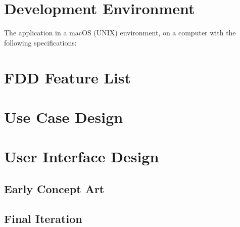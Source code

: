 \section{Development Environment}
The application in a macOS (UNIX) environment, on a computer with the following specifications:





\section{FDD Feature List}

\section{Use Case Design}

\section{User Interface Design}

\subsection{Early Concept Art}

\subsection{Final Iteration}